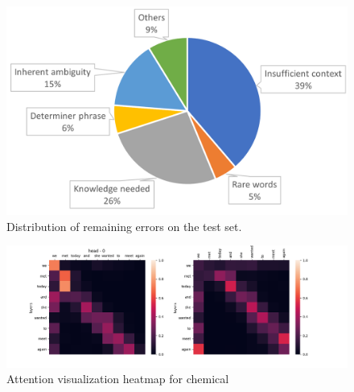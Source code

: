 \begin{figure}[t]
	\centering
	\includegraphics[width=0.9\columnwidth]{case_dist.png}
	\caption{Distribution of remaining errors on the test set.}
	\label{error_dist}
\end{figure}


\begin{figure}[t]
	\centering
	\includegraphics[width=2\columnwidth]{attn.png}
	\caption{Attention visualization heatmap for chemical }
	\label{fig:attn}
\end{figure}

